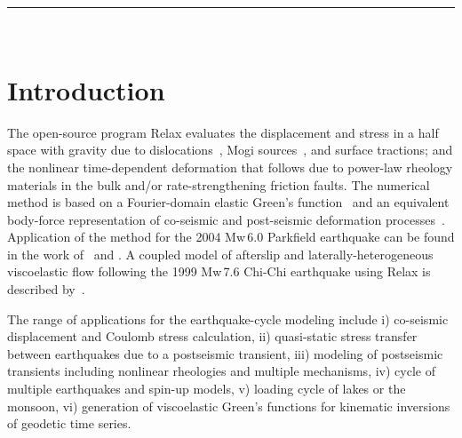 \documentclass[10pt]{article}
\begin{document}
{{\hspace{-0.24in}
\color{dark_grey}
\rule{\textwidth}{2pt}
}
}\\


\pagebreak
{}





\maketitle 


\vspace{1cm}


\pagestyle{fancy}
\cfoot{\thepage}

\section{Introduction}

The open-source program Relax evaluates the displacement and stress in a half space with gravity due to dislocations~\citep[e.g.,][]{okada92}, Mogi sources~\citep{mogi58}, and surface tractions; and the nonlinear time-dependent deformation that follows due to power-law rheology materials in the bulk and/or rate-strengthening friction faults. The numerical method is based on a Fourier-domain elastic Green's function~\citep{barbot+09b,barbot&fialko10a} and an equivalent body-force representation of co-seismic and post-seismic deformation processes~\citep{barbot+09a,barbot&fialko10b}. Application of the method for the 2004 Mw\,6.0 Parkfield earthquake can be found in the work of~\cite{barbot+09a} and \cite{bruhat+11}. A coupled model of afterslip and laterally-heterogeneous viscoelastic flow following the 1999 Mw\,7.6 Chi-Chi earthquake using Relax is described by~\cite{rousset+12}.

The range of applications for the earthquake-cycle modeling include i) co-seismic displacement and Coulomb stress calculation, ii) quasi-static stress transfer between earthquakes due to a postseismic transient, iii) modeling of postseismic transients including nonlinear rheologies and multiple mechanisms, iv) cycle of multiple earthquakes and spin-up models, v) loading cycle of lakes or the monsoon, vi) generation of viscoelastic Green's functions for kinematic inversions of geodetic time series.
\end{document}
